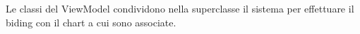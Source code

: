 Le classi del ViewModel condividono nella superclasse il sistema per effettuare il biding con il chart a cui sono associate.
